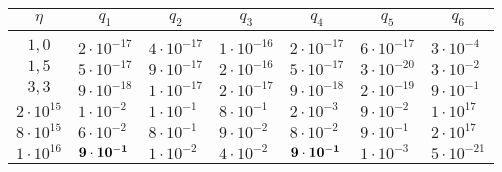 \begin{table*}\small
\begin{center}
\vspace*{2ex}

\begin{tabular}{|c|l|l|l|l|l|l|}
\hline
$\eta$ & \multicolumn{1}{c|}{$q_1$}& 
\multicolumn{1}{c|}{$q_2$}& \multicolumn{1}{c|}{$q_3$}& 
\multicolumn{1}{c|}{$q_4$}& \multicolumn{1}{c|}{$q_5$}& \multicolumn{1}{c|}{$q_6$}\\
\hline
&&&&&&\\[-9pt]
$1{,}0$ &  $2\cdot 10^{-17}$ &  $4\cdot 10^{-17}$ &  $1\cdot 10^{-16}$ &  $2\cdot 
10^{-17}$ &  $6\cdot 10^{-17}$&  $3\cdot 10^{-4}$ \\
$1{,}5$ &  $5\cdot 10^{-17}$ &  $9\cdot 10^{-17}$ &  $2\cdot 10^{-16}$ &  $5\cdot 
10^{-17}$ &  $3\cdot 10^{-20}$ &  $3\cdot 10^{-2}$ \\
$3{,}3$ &  $9\cdot 10^{-18}$ &  $1\cdot 10^{-17}$ &  $2\cdot 10^{-17}$ &  $9\cdot 
10^{-18}$ &  $2\cdot 10^{-19}$ &  $9\cdot 10^{-1}$ \\
$2\cdot 10^{15}$ &  $1\cdot 10^{-2}$ &  $1\cdot 10^{-1}$ &  $8\cdot 10^{-1}$ &  
$2\cdot 10^{-3}$ &  $9\cdot 10^{-2}$ &  $1\cdot 10^{17}$ \\
$8\cdot 10^{15}$ &  $6\cdot 10^{-2}$ &  $8\cdot 10^{-1}$ &  $9\cdot 10^{-2}$ &  
$8\cdot 10^{-2}$ &  $9\cdot 10^{-1}$ & $ 2\cdot 10^{17} $\\
$1\cdot 10^{16}$ &  $\bf9\cdot 10^{-1}$ &  $1\cdot 10^{-2}$& $ 4\cdot 10^{-2}$&  
$\bf9\cdot 10^{-1}$ &  $1\cdot 10^{-3}$ & $ 5\cdot 10^{-21}$ \\
\hline
\end{tabular}
\end{center}
\vspace*{-6pt}
\end{table*}

